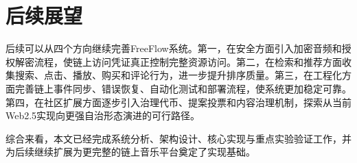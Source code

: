\section{后续展望}

后续可以从四个方向继续完善FreeFlow系统。第一，在安全方面引入加密音频和授权解密流程，使链上访问凭证真正控制完整资源访问。第二，在检索和推荐方面收集搜索、点击、播放、购买和评论行为，进一步提升排序质量。第三，在工程化方面完善链上事件同步、错误恢复、自动化测试和部署流程，使系统更加稳定可靠。第四，在社区扩展方面逐步引入治理代币、提案投票和内容治理机制，探索从当前Web2.5实现向更强自治形态演进的可行路径。

综合来看，本文已经完成系统分析、架构设计、核心实现与重点实验验证工作，并为后续继续扩展为更完整的链上音乐平台奠定了实现基础。
